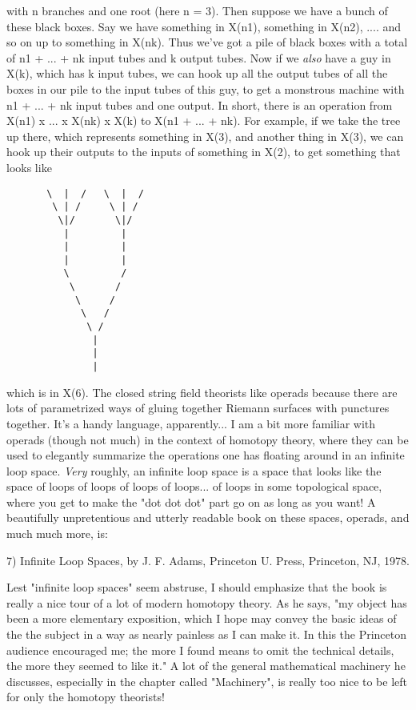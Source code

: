 with n branches and one root (here n = 3).  Then suppose we have a bunch
of these black boxes.  Say we have something in X(n1), something in
X(n2), .... and so on up to something in X(nk).  Thus we've got a pile
of black boxes with a total of n1 + ... + nk input tubes and k output
tubes.  Now if we \emph{also} have a guy in X(k), which has k input tubes, we
can hook up all the output tubes of all the boxes in our pile to the
input tubes of this guy, to get a monstrous machine with n1 + ... + nk
input tubes and one output.   In short, there is an operation from
X(n1) x ... x X(nk) x X(k) to X(n1 + ... + nk).  For example, if we take
the tree up there, which represents something in X(3), and another
thing in X(3), we can hook up their outputs to the inputs of something
in X(2), to get something that looks like

\begin{verbatim}
       \  |  /   \  |  /
        \ | /     \ | /
         \|/       \|/
          |         |
          |         |
          |         |
          \         /
           \       /
            \     / 
             \   /
              \ /
               |
               |
               |
\end{verbatim}
    

which is in X(6).  The closed string field theorists like operads
because there are lots of parametrized ways of gluing together Riemann
surfaces with punctures together.  It's a handy language, apparently...
I am a bit more familiar with operads (though not much) in the context
of homotopy theory, where they can be used to elegantly summarize the
operations one has floating around in an infinite loop space.  \emph{Very}
roughly, an infinite loop space is a space that looks like the space of 
loops of loops of loops of loops... of loops in some topological space,
where you get to make the "dot dot dot" part go on as long as you want!
A beautifully unpretentious and utterly readable book on these spaces,
operads, and much much more, is:

7) Infinite Loop Spaces, by J. F. Adams, Princeton U. Press, Princeton,
NJ, 1978.  

Lest "infinite loop spaces" seem abstruse, I should emphasize that the
book is really a nice tour of a lot of modern homotopy theory.  As he
says, "my object has been a more elementary exposition, which I hope may
convey the basic ideas of the the subject in a way as nearly painless as
I can make it.  In this the Princeton audience encouraged me; the more I
found means to omit the technical details, the more they seemed to like
it."  A lot of the general mathematical machinery he discusses,
especially in the chapter called "Machinery", is really too nice to be
left for only the homotopy theorists!  

